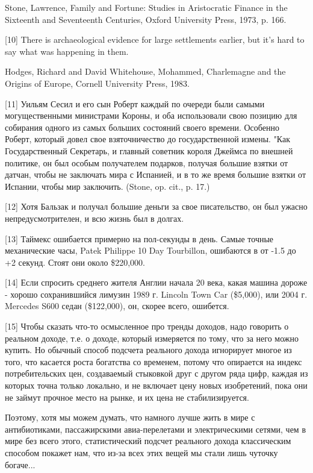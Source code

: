 \documentclass[ebook,12pt,oneside,openany]{memoir}
\begin{document}
Stone, Lawrence, Family and Fortune: Studies in Aristocratic Finance
in the Sixteenth and Seventeenth Centuries, Oxford University Press,
1973, p. 166.

[10] There is archaeological evidence for large settlements earlier,
but it's hard to say what was happening in them.

Hodges, Richard and David Whitehouse, Mohammed, Charlemagne and the
Origins of Europe, Cornell University Press, 1983.

[11] Уильям Сесил и его сын Роберт каждый по очереди были самыми
могущественными министрами Короны, и оба использовали свою позицию для
собирания одного из самых больших состояний своего времени. Особенно
Роберт, который довел свое взяточничество до государственной измены.
"Как Государственный Секретарь, и главный советник короля Джеймса по
внешней политике, он был особым получателем подарков, получая большие
взятки от датчан, чтобы не заключать мира с Испанией, и в то же время
большие взятки от Испании, чтобы мир заключить. (Stone, op. cit., p.
17.)

[12] Хотя Бальзак и получал большие деньги за свое писательство, он
был ужасно непредусмотрителен, и всю жизнь был в долгах.


[13] Таймекс ошибается примерно на пол-секунды в день. Самые точные
механические часы, Patek Philippe 10 Day Tourbillon, ошибаются в от
-1.5 до +2 секунд. Стоят они около \$220,000.

[14] Если спросить среднего жителя Англии начала 20 века, какая машина
дороже - хорошо сохранившийся лимузин 1989 г. Lincoln Town Car
(\$5,000), или 2004 г. Mercedes S600 седан (\$122,000), он, скорее
всего, ошибется.

[15] Чтобы сказать что-то осмысленное про тренды доходов, надо
говорить о реальном доходе, т.е. о доходе, который измеряется по тому,
что за него можно купить. Но обычный способ подсчета реального дохода
игнорирует многое из того, что касается роста богатства со временем,
потому что опирается на индекс потребительских цен, создаваемый
стыковкой друг с другом ряда цифр, каждая из которых точна только
локально, и не включает цену новых изобретений, пока они не займут
прочное место на рынке, и их цена не стабилизируется.

Поэтому, хотя мы можем думать, что намного лучше жить в мире с
антибиотиками, пассажирскими авиа-перелетами и электрическими сетями,
чем в мире без всего этого, статистический подсчет реального дохода
классическим способом покажет нам, что из-за всех этих вещей мы стали
лишь чуточку богаче...
\end{document}

